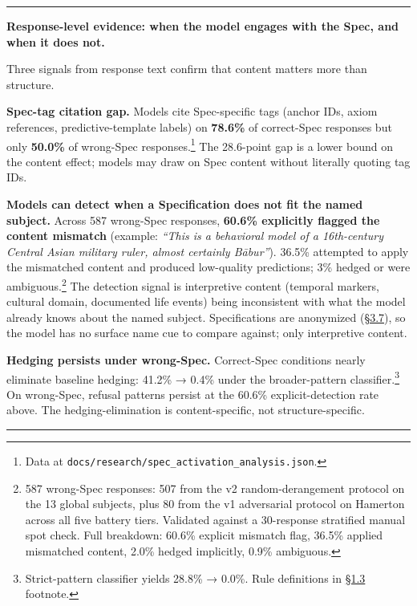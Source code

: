 \begin{center}\rule{0.5\linewidth}{0.5pt}\end{center}

\textbf{Response-level evidence: when the model engages with the Spec,
and when it does not.}

Three signals from response text confirm that content matters more than
structure.

\textbf{Spec-tag citation gap.} Models cite Spec-specific tags (anchor
IDs, axiom references, predictive-template labels) on \textbf{78.6\%} of
correct-Spec responses but only \textbf{50.0\%} of wrong-Spec
responses.\footnote{Data at
  \texttt{docs/research/spec\_activation\_analysis.json}.} The
28.6-point gap is a lower bound on the content effect; models may draw
on Spec content without literally quoting tag IDs.

\textbf{Models can detect when a Specification does not fit the named
subject.} Across 587 wrong-Spec responses, \textbf{60.6\% explicitly
flagged the content mismatch} (example: \emph{``This is a behavioral
model of a 16th-century Central Asian military ruler, almost certainly
Bābur''}). 36.5\% attempted to apply the mismatched content and produced
low-quality predictions; 3\% hedged or were ambiguous.\footnote{587
  wrong-Spec responses: 507 from the v2 random-derangement protocol on
  the 13 global subjects, plus 80 from the v1 adversarial protocol on
  Hamerton across all five battery tiers. Validated against a
  30-response stratified manual spot check. Full breakdown: 60.6\%
  explicit mismatch flag, 36.5\% applied mismatched content, 2.0\%
  hedged implicitly, 0.9\% ambiguous.} The detection signal is
interpretive content (temporal markers, cultural domain, documented life
events) being inconsistent with what the model already knows about the
named subject. Specifications are anonymized (\hyperref[pipeline-for-the-behavioral-specification]{§3.7}), so the model has no
surface name cue to compare against; only interpretive content.

\textbf{Hedging persists under wrong-Spec.} Correct-Spec conditions
nearly eliminate baseline hedging: 41.2\% → 0.4\% under the
broader-pattern classifier.\footnote{Strict-pattern classifier yields
  28.8\% → 0.0\%. Rule definitions in
  \protect\hyperlink{what-we-found}{§1.3} footnote.} On wrong-Spec,
refusal patterns persist at the 60.6\% explicit-detection rate above.
The hedging-elimination is content-specific, not structure-specific.

\begin{center}\rule{0.5\linewidth}{0.5pt}\end{center}

